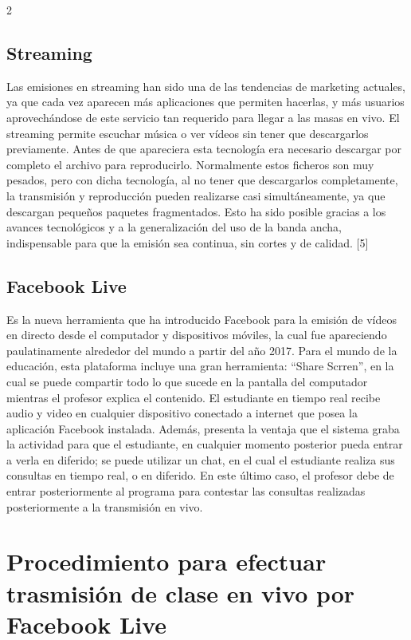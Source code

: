 \documentclass[11pt,spanish,Letterpaper,openany]{book}
\begin{document}
\begin {multicols}{2}
\hypertarget{streaming}{%
\subsection{Streaming}\label{streaming}}

Las emisiones en streaming han sido una de las tendencias de marketing actuales, ya que cada vez aparecen más aplicaciones que permiten hacerlas, y más usuarios aprovechándose de este servicio tan requerido para llegar a las masas en vivo. El streaming permite escuchar música o ver vídeos sin tener que descargarlos previamente. Antes de que apareciera esta tecnología era necesario descargar por completo el archivo para reproducirlo. Normalmente estos ficheros son muy pesados, pero con dicha tecnología, al no tener que descargarlos completamente, la transmisión y reproducción pueden realizarse casi simultáneamente, ya que descargan pequeños paquetes fragmentados. Esto ha sido posible gracias a los avances tecnológicos y a la generalización del uso de la banda ancha, indispensable para que la emisión sea continua, sin cortes y de calidad. {[}5{]}

\hypertarget{facebook-live}{%
\subsection{Facebook Live}\label{facebook-live}}

Es la nueva herramienta que ha introducido Facebook para la emisión de vídeos en directo desde el computador y dispositivos móviles, la cual fue apareciendo paulatinamente alrededor del mundo a partir del año 2017. Para el mundo de la educación, esta plataforma incluye una gran herramienta: ``Share Scrren'', en la cual se puede compartir todo lo que sucede en la pantalla del computador mientras el profesor explica el contenido. El estudiante en tiempo real recibe audio y video en cualquier dispositivo conectado a internet que posea la aplicación Facebook instalada. Además, presenta la ventaja que el sistema graba la actividad para que el estudiante, en cualquier momento posterior pueda entrar a verla en diferido; se puede utilizar un chat, en el cual el estudiante realiza sus consultas en tiempo real, o en diferido. En este último caso, el profesor debe de entrar posteriormente al programa para contestar las consultas realizadas posteriormente a la transmisión en vivo.

\hypertarget{procedimiento-para-efectuar-trasmision-de-clase-en-vivo-por-facebook-live}{%
\section{Procedimiento para efectuar trasmisión de clase en vivo por Facebook Live}\label{procedimiento-para-efectuar-trasmision-de-clase-en-vivo-por-facebook-live}}


\end{multicols}
\end{document}
